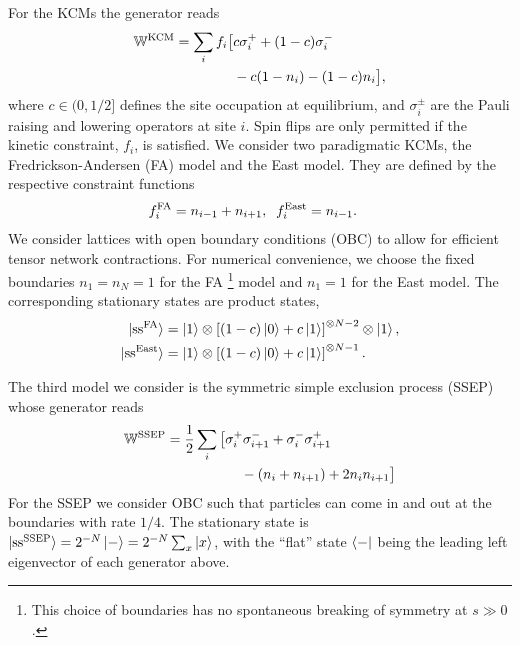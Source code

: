 \documentclass[prl,showpacs,superscriptaddress,twocolumn,longbibliography]{revtex4-1}
\begin{document}
For the KCMs the generator reads
\begin{align}
    \mathbb{W}^{\rm KCM} = \sum_{i} f_{i} \big[ &c\sigma_{i}^{+} + (1-c)\sigma_{i}^{-} 
    \nonumber \\
    &- c (1-n_{i}) - (1-c)n_{i} \big],
    \label{W}
\end{align}
where $c\in(0, 1/2]$ defines the site occupation at equilibrium, and $\sigma_{i}^{\pm}$ are the Pauli raising and lowering operators at site $i$. 
Spin flips are only permitted if the kinetic constraint, $f_{i}$, is satisfied.
We consider two paradigmatic KCMs, the Fredrickson-Andersen (FA) \cite{Fredrickson1984} model and the East \cite{Jackle1991} model. They are defined by the respective constraint functions
\begin{align}
    f_{i}^{{\rm FA}} &= n_{i-1} + n_{i + 1} , 
    \;\; 
    f_{i}^{{\rm East}} = n_{i-1} .
\end{align}
We consider lattices with open boundary conditions (OBC) to allow for efficient tensor network contractions. For numerical convenience, we choose the fixed boundaries $n_{1} = n_{N} = 1$ for the FA {\footnote{This choice of boundaries has no spontaneous breaking of symmetry at $s\gg0$.}} model and $n_{1} = 1$ for the East model.
The corresponding stationary states are product states, 
\begin{align}
    \ket{{\rm ss^{FA}}} &= \ket{1} \otimes \left[(1-c)\ket{0} + c\ket{1}\right]^{\otimes N-2} \otimes \ket{1},
    \\
    \ket{{\rm ss^{East}}} &= \ket{1}\otimes\left[(1-c)\ket{0} + c\ket{1}\right]^{\otimes N-1}.
\end{align}

The third model we consider is the symmetric simple exclusion process (SSEP) whose generator reads
\begin{align}
    \mathbb{W}^{\rm SSEP} = \frac{1}{2} \sum_{i} \big[ &
    	\sigma_{i}^{+} \sigma_{i+1}^{-} + 
    	\sigma_{i}^{-} \sigma_{i+1}^{+} 
	\label{SSEP}
	\\ & \;\;\;\;	
		- 
		(n_{i}+n_{i+1}) + 2 n_{i} n_{i+1} \big]
		\nonumber
\end{align}
For the SSEP we consider OBC such that particles can come in and out at the boundaries with rate $1/4$. The stationary state is $\ket{\rm ss^{\rm SSEP}} = 2^{-N}\ket{-} = 2^{-N}\sum_{x} \ket{x}$, with the ``flat'' state $\bra{-}$ being the leading left eigenvector of each generator above.

\smallskip
\end{document}
